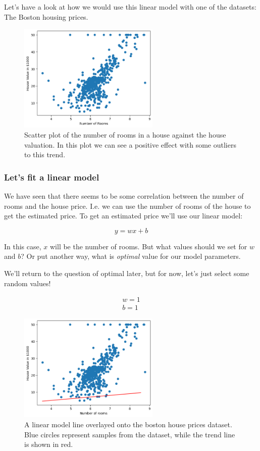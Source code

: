 \documentclass[10pt]{beamer}
\begin{document}
Let's have a look at how we would use this linear model with one of the datasets: The
Boston housing prices.

\begin{figure}[htbp]
\centering
\includegraphics[width=0.6\textwidth]{images/boston_rooms_prices.png}
\caption{Scatter plot of the number of rooms in a house against the house valuation. In this plot we can see a positive effect with some outliers to this trend.}
\end{figure}

\subsubsection*{Let's fit a linear model}
\label{sec:org03224b2}
We have seen that there seems to be some correlation between the number of rooms and
the house price. I.e. we can use the number of rooms of the house to get the
estimated price. To get an estimated price we'll use our linear model:

\[
y = w x + b
\]

In this case, \(x\) will be the number of rooms. But what values should we set for \(w\)
and \(b\)? Or put another way, what is \emph{optimal} value for our model parameters.

We'll return to the question of optimal later, but for now, let's just select some
random values!

\[\begin{aligned}
w = 1 \\
b = 1
\end{aligned}\]


\begin{figure}[htbp]
\centering
\includegraphics[width=0.6\textwidth]{images/boston_rm_first_pred.png}
\caption{A linear model line overlayed onto the boston house prices dataset. Blue circles represent samples from the dataset, while the trend line is shown in red.}
\end{figure}
\end{document}
